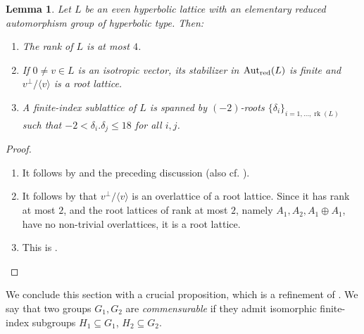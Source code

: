 \documentclass[11pt,letterpaper]{amsart}
\DeclareMathOperator{\rk}{rk}
\DeclareMathOperator{\Aut}{Aut}
\newcommand{\AutredL}{\Aut_{\rm red}(L)}
\newtheorem{lemma}[theorem]{Lemma}
\theoremstyle{definition}
\theoremstyle{remark}
\begin{document}
\begin{lemma}\label{lem:detect_virtually_abelian}
Let $L$ be an even hyperbolic lattice with an elementary reduced automorphism group of hyperbolic type. Then:
\begin{enumerate}
\item[(1)] The rank of $L$ is at most $4$.
\item[(2)] If $0\ne v\in L$ is an isotropic vector, its stabilizer in $\AutredL$ is finite and $v^\perp/\langle v \rangle$ is a root lattice. 
\item[(3)] A finite-index sublattice of $L$ is spanned by $(-2)$-roots $\{\delta_i\}_{i=1,\ldots,\rk(L)}$ such that $-2 < \delta_i . \delta_j \le 18$ for all $i,j$.
\end{enumerate}
\end{lemma}
\begin{proof}\hfill
\begin{enumerate}
\item[(1)] It follows by \cite[Theorem~9.1.1]{nikulin.factor.groups} and the preceding discussion (also cf. \cite[Theorem~3.9]{brandhorst.mezzedimi}).
\item[(2)] It follows by \cite[Theorem~3.9~and~Proposition~3.2]{brandhorst.mezzedimi} that $v^\perp/ \langle v \rangle$ is an overlattice of a root lattice. Since it has rank at most $2$, and the root lattices of rank at most $2$, namely $A_1,A_2,A_1\oplus A_1$, have no non-trivial overlattices, it is a root lattice.
\item[(3)] This is \cite[Lemma~1]{nikulin.interesting}. \qedhere
\end{enumerate}
\end{proof}

We conclude this section with a crucial proposition, which is a refinement of \cite[Theorem~3.6]{mezzedimi.entropy}. We say that two groups $G_1,G_2$ are \emph{commensurable} if they admit isomorphic finite-index subgroups $H_1\subseteq G_1$, $H_2\subseteq G_2$.
\end{document}
